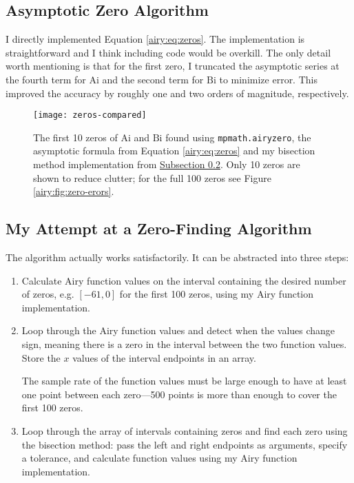 \documentclass[11pt, a4paper]{article}
\newcommand{\Ai}{\mathrm{Ai}}
\newcommand{\Bi}{\mathrm{Bi}}
\begin{document}
\subsection{Asymptotic Zero Algorithm}
I directly implemented Equation \ref{airy:eq:zeros}. The implementation is straightforward and I think including code would be overkill. The only detail worth mentioning is that for the first zero, I truncated the asymptotic series at the fourth term for $ \Ai $ and the second term for $ \Bi $ to minimize error. This improved the accuracy by roughly one and two orders of magnitude, respectively.

\begin{figure}[htb!]
	\centering
	\texttt{[image: zeros-compared]}
	\vspace{-8mm}
	\caption{The first 10 zeros of $ \Ai $ and $ \Bi $ found using \texttt{mpmath.airyzero}, the asymptotic formula from Equation \ref{airy:eq:zeros} and my bisection method implementation from \hyperref[airy:ss:zero-algorithm]{\underline{Subsection \ref{airy:ss:zero-algorithm}}}. Only 10 zeros are shown to reduce clutter; for the full 100 zeros see Figure \ref{airy:fig:zero-erors}.}
	\label{airy:fig:zeros-compared}
\end{figure}


\subsection{My Attempt at a Zero-Finding Algorithm} \label{airy:ss:zero-algorithm}
The algorithm actually works satisfactorily. It can be abstracted into three steps:
\begin{enumerate}
	\item Calculate Airy function values on the interval containing the desired number of zeros, e.g. $ [-61, 0] $ for the first 100 zeros, using my Airy function implementation.
	
	\item Loop through the Airy function values and detect when the values change sign, meaning there is a zero in the interval between the two function values. Store the $ x $ values of the interval endpoints in an array.	
	
	The sample rate of the function values must be large enough to have at least one point between each zero---500 points is more than enough to cover the first 100 zeros.
	
	\item Loop through the array of intervals containing zeros and find each zero using the bisection method: pass the left and right endpoints as arguments, specify a tolerance, and calculate function values using my Airy function implementation.
	
\end{enumerate}
\end{document}
